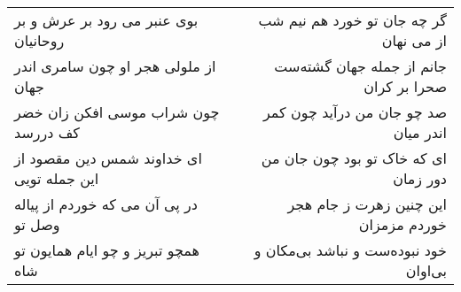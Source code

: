 \begin{center}
\begin{longtable}{l p{0.5cm} r}
بوی عنبر می رود بر عرش و بر روحانیان
&&
گر چه جان تو خورد هم نیم شب از می نهان
\\
از ملولی هجر او چون سامری اندر جهان
&&
جانم از جمله جهان گشته‌ست صحرا بر کران
\\
چون شراب موسی افکن زان خضر کف دررسد
&&
صد چو جان من درآید چون کمر اندر میان
\\
ای خداوند شمس دین مقصود از این جمله تویی
&&
ای که خاک تو بود چون جان من دور زمان
\\
در پی آن می که خوردم از پیاله وصل تو
&&
این چنین زهرت ز جام هجر خوردم مزمزان
\\
همچو تبریز و چو ایام همایون تو شاه
&&
خود نبوده‌ست و نباشد بی‌مکان و بی‌اوان
\\
\end{longtable}
\end{center}
